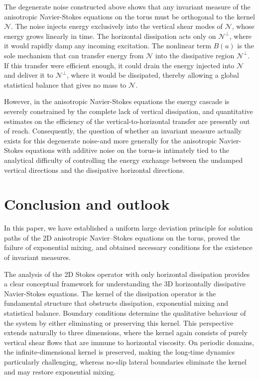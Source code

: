 \documentclass[11pt,a4paper,reqno]{amsart}
\theoremstyle{definition}
\begin{document}
The degenerate noise constructed above shows that any invariant measure of the
anisotropic Navier-Stokes equations on the torus must be orthogonal to the kernel
$\mathcal N$.  The noise injects energy exclusively into the  vertical
shear modes of $\mathcal N$, whose energy grows linearly in time.  The horizontal
dissipation acts only on $\mathcal N^\perp$, where it would rapidly damp any
incoming excitation.  The nonlinear term $B(u)$ is the sole mechanism that can
transfer energy from $\mathcal N$ into the dissipative region $\mathcal N^\perp$.
If this transfer were efficient enough, it could drain the energy injected into
$\mathcal N$ and deliver it to $\mathcal N^\perp$, where it would be dissipated,
thereby allowing a global statistical balance that gives no mass to $\mathcal N$.

However, in the anisotropic Navier-Stokes equations the energy cascade is
severely constrained by the complete lack of vertical dissipation, and
quantitative estimates on the efficiency of the vertical-to-horizontal transfer
are presently out of reach.  Consequently, the question of whether an invariant
measure actually exists for this degenerate noise-and more generally for the
anisotropic Navier-Stokes equations with additive noise on the torus-is
intimately tied to the analytical difficulty of controlling the
energy exchange between the undamped vertical directions and the dissipative
horizontal directions.


\section{Conclusion and outlook}\label{sec:conclusion}

In this paper, we have established a uniform large deviation principle for
solution paths of the 2D anisotropic Navier--Stokes equations on the torus,
proved the failure of exponential mixing, and obtained necessary conditions
for the existence of invariant measures.

The analysis of the 2D Stokes operator with only horizontal dissipation
provides a clear conceptual framework for understanding the 3D horizontally
dissipative Navier-Stokes equations. The kernel of the dissipation operator
is the fundamental structure that obstructs dissipation, exponential mixing
and statistical balance. Boundary conditions determine the qualitative
behaviour of the system by either eliminating or preserving this kernel.
This perspective extends naturally to three dimensions, where the kernel
again consists of purely vertical shear flows that are immune to horizontal
viscosity.  On periodic domains, the infinite-dimensional kernel  is preserved,
making the long-time dynamics particularly challenging, whereas
no-slip lateral boundaries eliminate the kernel and may restore exponential
mixing.
\end{document}
